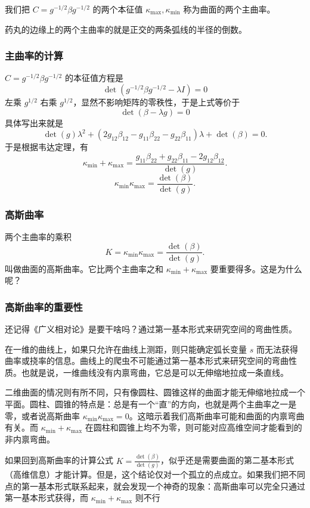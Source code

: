 \documentclass[CJK,13pt]{beamer}
\begin{document}
\begin{frame}
  我们把 $C=g^{-1/2}\beta g^{-1/2}$ 的两个本征值 $\kappa_{\max}, \kappa_{\min}$ 称为曲面的两个主曲率。
  

  药丸的边缘上的两个主曲率的就是正交的两条弧线的半径的倒数。
\end{frame}


\begin{frame}
  \frametitle{主曲率的计算}
  $C=g^{-1/2}\beta g^{-1/2}$  的本征值方程是
  $$  \det\left(g^{-1/2}\beta g^{-1/2} - \lambda I \right) = 0$$
  左乘  $g^{1/2}$ 右乘 $g^{1/2}$，显然不影响矩阵的零秩性，于是上式等价于
  $$ \det\left(\beta - \lambda g\right) = 0$$
  具体写出来就是
  $$ \det(g) \lambda^2 +(2g_{12}\beta_{12}-g_{11}\beta_{22}-g_{22}\beta_{11})\lambda +\det(\beta) = 0.$$
  于是根据韦达定理，有
  $$ \kappa_{\min}+\kappa_{\max} = \frac{g_{11}\beta_{22}+g_{22}\beta_{11}-2g_{12}\beta_{12}}{\det(g)}.$$
  $$ \kappa_{\min}\kappa_{\max} = \frac{\det(\beta)}{\det(g)}.$$  
\end{frame}


\begin{frame}
  \frametitle{高斯曲率}
  两个主曲率的乘积
  $$K = \kappa_{\min}\kappa_{\max} = \frac{\det(\beta)}{\det(g)}.$$
  叫做曲面的{\blue 高斯曲率}。它比两个主曲率之和 $\kappa_{\min}+\kappa_{\max} $ 要重要得多。这是为什么呢？

\end{frame}


\begin{frame}
  \frametitle{高斯曲率的重要性}
  {\small
    还记得《广义相对论》是要干啥吗？{\blue 通过第一基本形式来研究空间的弯曲性质。}

    在一维的曲线上，如果只允许在曲线上测距，则只能确定弧长变量 $s$ 而无法获得曲率或挠率的信息。曲线上的爬虫不可能通过第一基本形式来研究空间的弯曲性质。也就是说，{\blue 一维曲线没有内禀弯曲，它总是可以无伸缩地拉成一条直线。}

    二维曲面的情况则有所不同，只有像圆柱、圆锥这样的曲面才能无伸缩地拉成一个平面。圆柱、圆锥的特点是：总是有一个“直”的方向，也就是两个主曲率之一是零，或者说高斯曲率 $\kappa_{\min}\kappa_{\max} = 0$。这暗示着我们高斯曲率可能和曲面的内禀弯曲有关。而 $\kappa_{\min}+\kappa_{\max}$ 在圆柱和圆锥上均不为零，则可能对应高维空间才能看到的非内禀弯曲。 

    如果回到高斯曲率的计算公式 $K=\frac{\det(\beta)}{\det(g)}$，似乎还是需要曲面的第二基本形式（高维信息）才能计算。但是，这个结论仅对一个孤立的点成立。如果我们把不同点的第一基本形式联系起来，就会发现一个神奇的现象：高斯曲率可以完全只通过第一基本形式获得，而 $\kappa_{\min}+\kappa_{\max}$ 则不行
  }
\end{frame}
\end{document}
